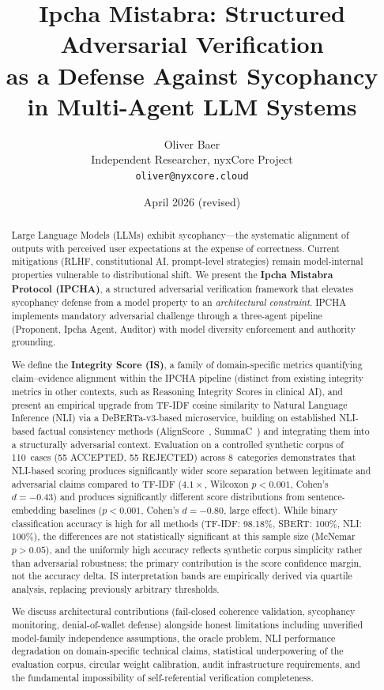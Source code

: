 \documentclass[11pt,a4paper]{article}
\title{%
  Ipcha Mistabra: Structured Adversarial Verification\\
  as a Defense Against Sycophancy\\
  in Multi-Agent LLM Systems%
}
\author{%
  Oliver Baer\\
  Independent Researcher, nyxCore Project\\
  \texttt{oliver@nyxcore.cloud}%
}
\date{April 2026 (revised)}
\begin{document}
\maketitle

\begin{abstract}
Large Language Models (LLMs) exhibit sycophancy---the systematic
alignment of outputs with perceived user expectations at the expense
of correctness.  Current mitigations (RLHF, constitutional AI,
prompt-level strategies) remain model-internal properties vulnerable
to distributional shift.  We present the \textbf{Ipcha Mistabra
Protocol (IPCHA)}, a structured adversarial verification framework
that elevates sycophancy defense from a model property to an
\emph{architectural constraint}.  IPCHA implements mandatory
adversarial challenge through a three-agent pipeline (Proponent,
Ipcha Agent, Auditor) with model diversity enforcement and authority
grounding.

We define the \textbf{Integrity Score (IS)}, a family of
domain-specific metrics quantifying claim--evidence alignment
within the IPCHA pipeline (distinct from existing integrity
metrics in other contexts, such as Reasoning Integrity
Scores in clinical AI), and present an empirical
upgrade from TF-IDF cosine similarity to Natural Language Inference
(NLI) via a DeBERTa-v3-based microservice, building on established
NLI-based factual consistency methods (AlignScore~\cite{zha2023alignscore},
SummaC~\cite{laban2022summac}) and integrating them into a
structurally adversarial context.  Evaluation on a controlled
synthetic corpus of 110~cases (55 ACCEPTED, 55 REJECTED) across
8~categories demonstrates that NLI-based scoring produces
significantly wider score separation between legitimate and
adversarial claims compared to TF-IDF ($4.1\times$, Wilcoxon
$p<0.001$, Cohen's $d=-0.43$) and produces significantly different
score distributions from sentence-embedding baselines ($p<0.001$,
Cohen's $d=-0.80$, large effect).  While binary classification accuracy is
high for all methods (TF-IDF: 98.18\%, SBERT: 100\%, NLI: 100\%),
the differences are not statistically significant at this sample size
(McNemar $p>0.05$), and the uniformly high accuracy reflects
synthetic corpus simplicity rather than adversarial robustness; the
primary contribution is the score confidence margin, not the accuracy
delta.  IS interpretation bands are empirically derived via quartile
analysis, replacing previously arbitrary thresholds.

We discuss architectural contributions (fail-closed coherence
validation, sycophancy monitoring, denial-of-wallet defense)
alongside honest limitations including unverified model-family
independence assumptions, the oracle problem, NLI performance
degradation on domain-specific technical claims, statistical
underpowering of the evaluation corpus, circular weight calibration,
audit infrastructure requirements, and the fundamental impossibility
of self-referential verification completeness.
\end{abstract}
\end{document}
